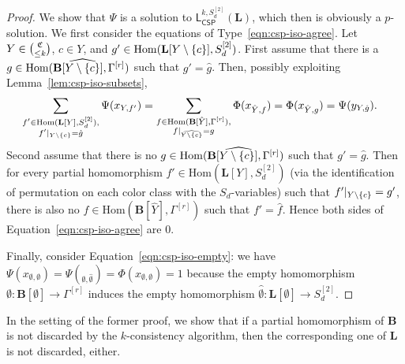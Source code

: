 \documentclass[a4paper,english, thm-restate]{lipics-v2021}
\DeclarePairedDelimiter\set{\lbrace}{\rbrace}
\newcommand{\StructB}{\mathbf{B}}
\newcommand{\StructL}{\mathbf{L}}
\newcommand{\restrict}[2]{#1|_{#2}}
\newcommand{\Hom}[2]{\mathrm{Hom}(#1,#2)}
\newcommand{\leqs}{\mathsf{L}}
\newcommand{\cspiso}[3]{\leqs^{#1,#2}_{\mathsf{CSP}}(#3)}
\newcommand{\colors}{\mathfrak{C}}
\newcommand{\CosetGrpTmplt}[2]{#1^{[#2]}}
\newcommand{\Sym}[1]{S_{#1}}
\newcommand{\SymStruct}[2]{\CosetGrpTmplt{\Sym{#1}}{#2}}
\begin{document}
\begin{proof}
		We show that $\Psi$ is a solution to 
		$\cspiso{k}{\SymStruct{d}{2}}{\StructL}$,
		which then is obviously a $p$-solution.
		We first consider the equations of Type~\ref{eqn:csp-iso-agree}.
		Let $Y \in \tbinom{\colors}{\leq k}$,
		$c \in Y$, and $g' \in \Hom{\StructL[Y \setminus \set{c}]}{\SymStruct{d}{2}}$.
		First assume that there is a $g \in \Hom{\StructB[\widehat{Y\setminus \set{c}}]}{\CosetGrpTmplt{\Gamma}{r}}$ such that $g' = \hat{g}$.
		Then, possibly exploiting Lemma~\ref{lem:csp-iso-subsets},
		\begin{align*}
			\sum_{\substack{f' \in \Hom {\StructL[Y]}{\SymStruct{d}{2}},\\ \restrict{f'}{Y\setminus\set{c}}= \hat{g}}} \Psi(x_{Y,f'})  &=
			\sum_{\substack{f \in \Hom{\StructB[\hat{Y}]}{\CosetGrpTmplt{\Gamma}{r}},\\ \restrict{f}{\widehat{Y \setminus \set{c}}} = g}} \Phi(x_{\hat{Y},f})
			= \Phi(x_{\hat{Y},g}) = \Psi(y_{Y, \hat{g}}).
		\end{align*}
		Second assume that there is no $g \in \Hom{\StructB[\widehat{Y\setminus \set{c}]}}{\CosetGrpTmplt{\Gamma}{r}}$ such that $g' = \hat{g}$.
		Then for every partial homomorphism $ f'\in \Hom {\StructL[Y]}{\SymStruct{d}{2}}$ (via the identification of permutation on each color class with the $S_d$\nobreakdash-variables) such that $\restrict{f'}{Y\setminus\set{c}} = g'$,
		there is also no $f \in \Hom{\StructB[\hat{Y}]}{\CosetGrpTmplt{\Gamma}{r}}$ such that $f' = \hat{f}$.
		Hence both sides of Equation~\ref{eqn:csp-iso-agree} are $0$.
		
		Finally, consider Equation~\ref{eqn:csp-iso-empty}:
		we have $\Psi(x_{\emptyset,\emptyset}) = \Psi(_{\emptyset,\hat{\emptyset}}) = \Phi(x_{\emptyset,\emptyset}) = 1$
		because the empty homomorphism $\emptyset \colon \StructB[\emptyset] \to \CosetGrpTmplt{\Gamma}{r}$
		induces the empty homomorphism $\hat{\emptyset} \colon \StructL[\emptyset] \to \SymStruct{d}{2}$.
	\end{proof}
	
	\noindent In the setting of the former proof,
	we show that if a partial homomorphism of $\StructB$
	is not discarded by the $k$-consistency algorithm,
	then the corresponding one of $\StructL$ is not discarded, either.
	
\end{document}
